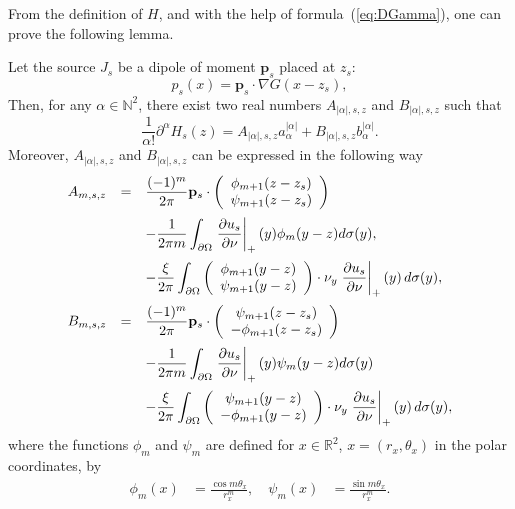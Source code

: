 From the definition of $H$, and with the help of
formula~(\ref{eq:DGamma}), one can prove the following lemma.
\begin{lemma}
Let the source $J_s$ be a dipole of moment $\mathbf{p}_{s}$ placed
at $z_{s}$:
\begin{equation} \label{formps}
p_{s}(x)=\mathbf{p}_{s}\cdot\nabla G(x-z_{s}),
\end{equation}
Then, for any $\alpha\in\mathbb{N}^{2}$, there exist two real
numbers $A_{\left|\alpha\right|,s,z}$ and
$B_{\left|\alpha\right|,s,z}$ such that
\[
\frac{1}{\alpha!}\partial^{\alpha}H_{s}(z)=A_{\left|\alpha\right|,s,z}a_{\alpha}^{\left|\alpha\right|}
+B_{\left|\alpha\right|,s,z}b_{\alpha}^{\left|\alpha\right|}.
\]
Moreover, $A_{\left|\alpha\right|,s,z}$ and
$B_{\left|\alpha\right|,s,z}$ can be expressed in the following
way
\[
\begin{array}{lll}A_{m,s,z} & =&\ds \frac{(-1)^{m}}{2\pi}\mathbf{p}_{s}\cdot\left(\begin{array}{c}
\phi_{m+1}(z-z_{s})\\
\psi_{m+1}(z-z_{s})
\end{array}\right)\\ \nm &&\ds -\frac{1}{2\pi m}\int_{\partial\Omega}\left.\frac{\partial u_{s}}{\partial\nu}
\right|_{+}(y)\phi_{m}(y-z)d\sigma(y),\\
\nm &&\ds -\frac{\xi}{2\pi }\int_{\partial\Omega}
\left(\begin{array}{c}
\phi_{m+1}(y-z)\\
\psi_{m+1}(y-z)
\end{array}\right)\cdot \nu_y \left.\frac{\partial u_{s}}{\partial\nu}
\right|_{+}(y)\, d\sigma(y),
\\
\nm B_{m,s,z} &=&\ds
\frac{(-1)^{m}}{2\pi}\mathbf{p}_{s}\cdot\left(\begin{array}{c}
\psi_{m+1}(z-z_{s})\\
-\phi_{m+1}(z-z_{s})
\end{array}\right)\\ \nm && \ds -\frac{1}{2\pi m}
\int_{\partial\Omega}\left.\frac{\partial
u_{s}}{\partial\nu}\right|_{+}(y)\psi_{m}(y-z)d\sigma(y)\\
\nm &&\ds -\frac{\xi}{2\pi }\int_{\partial\Omega}
\left(\begin{array}{c}
\psi_{m+1}(y-z)\\
-\phi_{m+1}(y-z)
\end{array}\right)\cdot \nu_y \left.\frac{\partial u_{s}}{\partial\nu}
\right|_{+}(y)\, d\sigma(y),
\end{array}
\]
where the functions $\phi_{m}$ and $\psi_{m}$ are defined for
$x\in\mathbb{R}^{2}$, $x=(r_{x},\theta_{x})$ in the polar
coordinates, by
\[
\begin{alignedat}{1}\phi_{m}(x) & =\frac{\cos
m\theta_{x}}{r_{x}^{m}},\quad \psi_{m}(x) & =\frac{\sin
m\theta_{x}}{r_{x}^{m}}.
\end{alignedat}
\]
\end{lemma}
